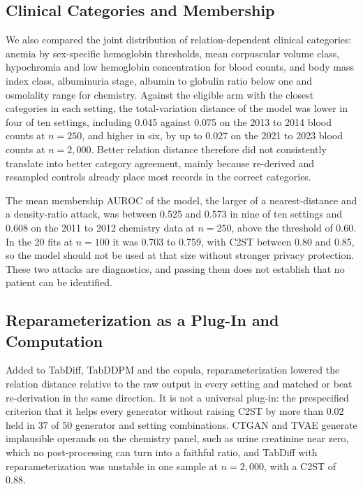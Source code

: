 \documentclass[conference]{IEEEtran}
\begin{document}
\subsection*{Clinical Categories and Membership}

We also compared the joint distribution of relation-dependent clinical categories: anemia by sex-specific hemoglobin thresholds, mean corpuscular volume class, hypochromia and low hemoglobin concentration for blood counts, and body mass index class, albuminuria stage, albumin to globulin ratio below one and osmolality range for chemistry. Against the eligible arm with the closest categories in each setting, the total-variation distance of the model was lower in four of ten settings, including 0.045 against 0.075 on the 2013 to 2014 blood counts at $n = 250$, and higher in six, by up to 0.027 on the 2021 to 2023 blood counts at $n = 2{,}000$. Better relation distance therefore did not consistently translate into better category agreement, mainly because re-derived and resampled controls already place most records in the correct categories.

The mean membership AUROC of the model, the larger of a nearest-distance and a density-ratio attack, was between 0.525 and 0.573 in nine of ten settings and 0.608 on the 2011 to 2012 chemistry data at $n = 250$, above the threshold of 0.60. In the 20 fits at $n = 100$ it was 0.703 to 0.759, with C2ST between 0.80 and 0.85, so the model should not be used at that size without stronger privacy protection. These two attacks are diagnostics, and passing them does not establish that no patient can be identified.

\subsection*{Reparameterization as a Plug-In and Computation}

Added to TabDiff, TabDDPM and the copula, reparameterization lowered the relation distance relative to the raw output in every setting and matched or beat re-derivation in the same direction. It is not a universal plug-in: the prespecified criterion that it helps every generator without raising C2ST by more than 0.02 held in 37 of 50 generator and setting combinations. CTGAN and TVAE generate implausible operands on the chemistry panel, such as urine creatinine near zero, which no post-processing can turn into a faithful ratio, and TabDiff with reparameterization was unstable in one sample at $n = 2{,}000$, with a C2ST of 0.88.
\end{document}
